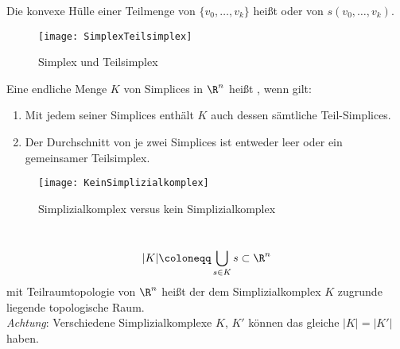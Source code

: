 \begin{minipage}{.45\textwidth}
  \begin{definition}
    Die konvexe Hülle einer Teilmenge von \( \{ v_0, \dots, v_k \} \) heißt \label{def:seite} oder  von \( s(v_0, \dots, v_k) \).
  \end{definition}
\end{minipage}
\hfill
\begin{minipage}{.45\textwidth}
  \begin{figure}[H]
    \texttt{[image: SimplexTeilsimplex]}
    \caption{Simplex und Teilsimplex}
  \end{figure}
\end{minipage}

\begin{definition}[Simplizialkomplex]
  Eine endliche Menge \( K \) von Simplices in \( \R^n \) heißt \label{def:simplizialkomplex}, wenn gilt:
  \begin{enumerate}
    \item Mit jedem seiner Simplices enthält \( K \) auch dessen sämtliche Teil-Simplices.
    \item Der Durchschnitt von je zwei Simplices ist entweder leer oder ein gemeinsamer Teilsimplex. 
  \end{enumerate}
  \begin{figure}[H]
    \texttt{[image: KeinSimplizialkomplex]}
    \caption{Simplizialkomplex versus kein Simplizialkomplex}
  \end{figure}
\end{definition}

\begin{definition}
  \
  \begin{equation*}
    \vert K \vert \coloneqq \bigcup_{s \in K} s \subset \R^n
  \end{equation*}
  mit Teilraumtopologie von \( \R^n \) heißt der dem Simplizialkomplex \( K \) zugrunde liegende topologische Raum. \\
  \emph{Achtung}: Verschiedene Simplizialkomplexe \( K \), \( K' \) können das gleiche \( \vert K \vert = \vert K' \vert \) haben.
\end{definition}

